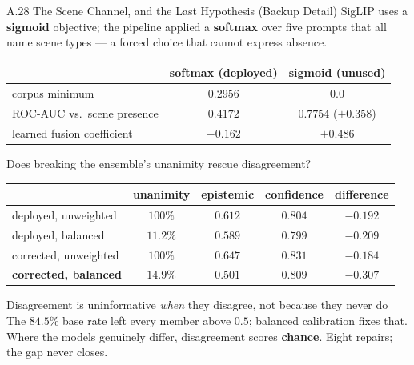 \documentclass[aspectratio=169,11pt]{beamer}
\begin{document}
\begin{frame}{A.28 The Scene Channel, and the Last Hypothesis (Backup Detail)}
\scriptsize
SigLIP uses a \textbf{sigmoid} objective; the pipeline applied a \textbf{softmax} over five prompts that all name scene types --- a forced choice that cannot express absence.
\vspace{0.5mm}
\begin{center}\scriptsize
\begin{tabular}{@{}l c c@{}}
\toprule
& \textbf{softmax (deployed)} & \textbf{sigmoid (unused)} \\
\midrule
corpus minimum & $0.2956$ & $\mathbf{0.0}$ \\
ROC-AUC vs.\ scene presence & $\mathbf{0.4172}$ & $\mathbf{0.7754}$ \quad ($+0.358$) \\
learned fusion coefficient & $-0.162$ & $+0.486$ \\
\bottomrule
\end{tabular}
\end{center}
\vspace{-1mm}
\begin{center}\scriptsize
Does breaking the ensemble's unanimity rescue disagreement?

\begin{tabular}{@{}l c c c c@{}}
\toprule
& \textbf{unanimity} & \textbf{epistemic} & \textbf{confidence} & \textbf{difference} \\
\midrule
deployed, unweighted & $100\%$ & $0.612$ & $0.804$ & $-0.192$ \\
deployed, balanced & $11.2\%$ & $0.589$ & $0.799$ & $-0.209$ \\
corrected, unweighted & $100\%$ & $0.647$ & $0.831$ & $-0.184$ \\
\textbf{corrected, balanced} & $\mathbf{14.9\%}$ & $\mathbf{0.501}$ & $0.809$ & $\mathbf{-0.307}$ \\
\bottomrule
\end{tabular}
\end{center}
\vspace{-2mm}
\begin{alertblock}{\scriptsize Disagreement is uninformative \emph{when} they disagree, not because they never do}
\scriptsize The $84.5\%$ base rate left every member above $0.5$; balanced calibration fixes that. Where the models genuinely differ, disagreement scores \textbf{chance}. Eight repairs; the gap never closes.
\end{alertblock}
\end{frame}
\end{document}
